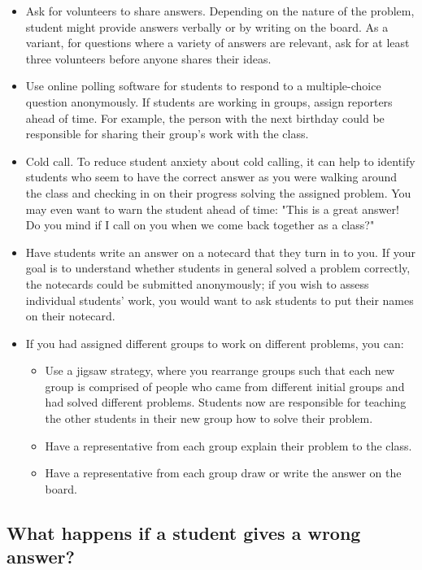 \begin{itemize}
\item Ask for volunteers to share answers. Depending on the nature of the problem, student might provide answers verbally or by writing on the board. As a variant, for questions where a variety of answers are relevant, ask for at least three volunteers before anyone shares their ideas.
  
\item Use online polling software for students to respond to a multiple-choice question anonymously.
  If students are working in groups, assign reporters ahead of time. For example, the person with the next birthday could be responsible for sharing their group’s work with the class.
  
\item Cold call. To reduce student anxiety about cold calling, it can help to identify students who seem to have the correct answer as you were walking around the class and checking in on their progress solving the assigned problem. You may even want to warn the student ahead of time: "This is a great answer! Do you mind if I call on you when we come back together as a class?"
  
\item Have students write an answer on a notecard that they turn in to you.  If your goal is to understand whether students in general solved a problem correctly, the notecards could be submitted anonymously; if you wish to assess individual students’ work, you would want to ask students to put their names on their notecard.
  
\item If you had assigned different groups to work on different problems, you can:
  \begin{itemize}
  \item Use a jigsaw strategy, where you rearrange groups such that each new group is comprised of people who came from different initial groups and had solved different problems.  Students now are responsible for teaching the other students in their new group how to solve their problem.
  \item Have a representative from each group explain their problem to the class.
  \item Have a representative from each group draw or write the answer on the board.
  \end{itemize}
\end{itemize}

\subsection{What happens if a student gives a wrong answer?}
\label{sec:what-happens-if}


